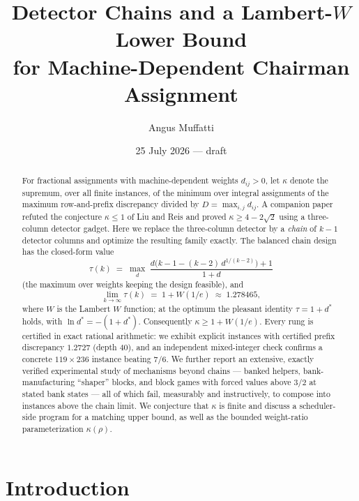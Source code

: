 \documentclass[11pt]{article}
\title{Detector Chains and a Lambert-$W$ Lower Bound\\
for Machine-Dependent Chairman Assignment}
\author{Angus Muffatti}
\date{25 July 2026 --- draft}
\theoremstyle{definition}
\newcommand{\W}{W}
\begin{document}
\maketitle

\begin{abstract}
For fractional assignments with machine-dependent weights $d_{ij}>0$, let
$\kappa$ denote the supremum, over all finite instances, of the minimum over
integral assignments of the maximum row-and-prefix discrepancy divided by
$D=\max_{i,j}d_{ij}$.  A companion paper refuted the conjecture $\kappa\le1$
of Liu and Reis and proved $\kappa\ge4-2\sqrt2$ using a three-column
detector gadget.  Here we replace the three-column detector by a
\emph{chain} of $k-1$ detector columns and optimize the resulting family
exactly.  The balanced chain design has the closed-form value
\[
 \tau(k)\;=\;\max_{d}\;
 \frac{d\bigl(k-1-(k-2)\,d^{1/(k-2)}\bigr)+1}{1+d}
\]
(the maximum over weights keeping the design feasible), and
\[
 \lim_{k\to\infty}\tau(k)\;=\;1+\W(1/e)\;\approx\;1.278465,
\]
where $\W$ is the Lambert $\W$ function; at the optimum the pleasant identity
$\tau=1+d^*$ holds, with $\ln d^*=-(1+d^*)$.  Consequently
$\kappa\ge1+\W(1/e)$.  Every rung is certified in exact rational
arithmetic: we exhibit explicit instances with certified prefix
discrepancy $1.2727$ (depth $40$), and an independent mixed-integer check
confirms a concrete $119\times236$ instance beating $7/6$.  We further
report an extensive, exactly verified experimental study of mechanisms
beyond chains --- banked helpers, bank-manufacturing ``shaper'' blocks, and
block games with forced values above $3/2$ at stated bank states --- all of
which fail, measurably and instructively, to compose into instances above
the chain limit.  We conjecture that $\kappa$ is finite and discuss a
scheduler-side program for a matching upper bound, as well as the bounded
weight-ratio parameterization $\kappa(\rho)$.
\end{abstract}

\section{Introduction}
\end{document}
